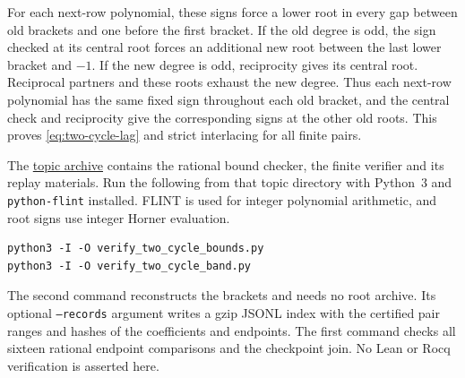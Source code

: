 For each next-row polynomial, these signs force a lower root in
every gap between old brackets and one before the first bracket.
If the old degree is odd, the sign checked at its central root
forces an additional new root between the last lower bracket and
$-1$. If the new degree is odd, reciprocity gives its central root.
Reciprocal partners and these roots exhaust the new degree.
Thus each next-row polynomial has the same fixed sign throughout
each old bracket, and the central check and reciprocity give the
corresponding signs at the other old roots. This proves
\eqref{eq:two-cycle-lag} and strict interlacing for all finite pairs.

The \href{https://github.com/ProgramComputer/open-math-research/tree/research/topics/long-cycle-excedances}{topic archive}
contains the rational bound checker, the finite verifier and its replay
materials. Run the following from that topic directory with Python~3
and \texttt{python-flint} installed. FLINT is used for integer
polynomial arithmetic, and root signs use integer Horner evaluation.
\begin{verbatim}
python3 -I -O verify_two_cycle_bounds.py
python3 -I -O verify_two_cycle_band.py
\end{verbatim}
The second command reconstructs the brackets and needs no root archive.
Its optional \texttt{--records} argument writes a gzip JSONL index with
the certified pair ranges and hashes of the coefficients and endpoints.
The first command checks all sixteen rational endpoint comparisons and
the checkpoint join. No Lean or Rocq verification is asserted here.
